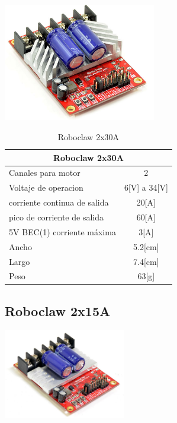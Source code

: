 \documentclass[a4paper]{book}
\begin{document}
\begin{center}
\includegraphics[width=0.5\textwidth]{Figures/Hardware/Partes/Roboclaw_2x30A.png}
\label{fig:Hardware:Partes:Roboclaw:2x30A}
\end{center}


\begin{table}[H]
\begin{center}
\begin{tabular}{|l|l|}%


\hline
\multicolumn{2}{|c|}{Roboclaw 2x30A} \\ \hline %
Canales para motor & \multicolumn{1}{|c|}{2}\\ \hline
Voltaje de operacion & \multicolumn{1}{|c|}{6[V] a 34[V]}\\ \hline
corriente continua de salida & \multicolumn{1}{|c|}{20[A]}\\ \hline
pico de corriente de salida & \multicolumn{1}{|c|}{60[A]}\\ \hline
5V BEC(1) corriente máxima & \multicolumn{1}{|c|}{3[A]}\\ \hline
Ancho & \multicolumn{1}{|c|}{5.2[cm]}\\ \hline
Largo & \multicolumn{1}{|c|}{7.4[cm]}\\ \hline
Peso & \multicolumn{1}{|c|}{63[g]}\\ \hline

\end{tabular}
\caption{Roboclaw 2x30A}
\label{Datos de la Roboclaw}
\end{center}
\end{table}

\subsection{Roboclaw 2x15A}

\begin{center}
\includegraphics[width=0.4\textwidth]{Figures/Hardware/Partes/Roboclaw_2x15A.png}
\label{fig:Hardware:Partes:Roboclaw:2x15A}
\end{center}
\end{document}
